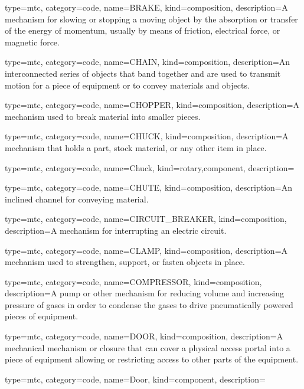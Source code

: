 {
  type=mtc,
  category=code,
  name={BRAKE},
  kind={composition},
  description={A mechanism for slowing or stopping a moving object by the absorption or transfer of the energy of momentum, usually by means of friction, electrical force, or magnetic force.}
}


{
  type=mtc,
  category=code,
  name={CHAIN},
  kind={composition},
  description={An interconnected series of objects that band together and are used to transmit motion for a piece of equipment or to convey materials and objects.}
}


{
  type=mtc,
  category=code,
  name={CHOPPER},
  kind={composition},
  description={A mechanism used to break material into smaller pieces.}
}


{
  type=mtc,
  category=code,
  name={CHUCK},
  kind={composition},
  description={A mechanism that holds a part, stock material, or any other item in place.}
}


{
  type=mtc,
  category=code,
  name={Chuck},
  kind={rotary,component},
  description={}
}


{
  type=mtc,
  category=code,
  name={CHUTE},
  kind={composition},
  description={An inclined channel for conveying material.}
}


{
  type=mtc,
  category=code,
  name={CIRCUIT\_BREAKER},
  kind={composition},
  description={A mechanism for interrupting an electric circuit.}
}


{
  type=mtc,
  category=code,
  name={CLAMP},
  kind={composition},
  description={A mechanism used to strengthen, support, or fasten objects in place.}
}


{
  type=mtc,
  category=code,
  name={COMPRESSOR},
  kind={composition},
  description={A pump or other mechanism for reducing volume and increasing pressure of gases in order to condense the gases to drive pneumatically powered pieces of equipment.}
}


{
  type=mtc,
  category=code,
  name={DOOR},
  kind={composition},
  description={A mechanical mechanism or closure that can cover a physical access portal into a piece of equipment allowing or restricting access to other parts of the equipment.}
}


{
  type=mtc,
  category=code,
  name={Door},
  kind={component},
  description={}
}


